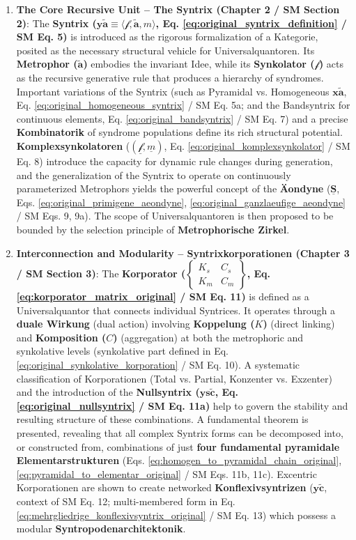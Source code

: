 \documentclass[12pt]{article}
\newcommand{\syntrix}{\bm{y\widetilde{a}}}
\newcommand{\homogeneoussyntrix}{\bm{x\widetilde{a}}}
\newcommand{\metrophor}{\bm{\widetilde{a}}}
\newcommand{\synkolator}{\mathcal{f}}
\newcommand{\synkolationsstufe}{m}
\newcommand{\korporatoroperator}{\begin{Bmatrix} K_s & C_s \\ K_m & C_m \end{Bmatrix}}
\newcommand{\nullsyntrix}{\bm{ys\widetilde{c}}}
\newcommand{\konflexivsyntrix}{\bm{y\widetilde{c}}}
\begin{document}
\begin{enumerate}
    \item \textbf{The Core Recursive Unit – The Syntrix (Chapter 2 / SM Section 2)}: The \textbf{Syntrix (\( \syntrix \equiv \langle \synkolator, \metrophor, \synkolationsstufe \rangle \), Eq. \eqref{eq:original_syntrix_definition} / SM Eq. 5)} is introduced as the rigorous formalization of a Kategorie, posited as the necessary structural vehicle for Universalquantoren. Its \textbf{Metrophor (\( \metrophor \))} embodies the invariant Idee, while its \textbf{Synkolator (\( \synkolator \))} acts as the recursive generative rule that produces a hierarchy of syndromes. Important variations of the Syntrix (such as Pyramidal vs. Homogeneous \( \homogeneoussyntrix \), Eq. \eqref{eq:original_homogeneous_syntrix} / SM Eq. 5a; and the Bandsyntrix for continuous elements, Eq. \eqref{eq:original_bandsyntrix} / SM Eq. 7) and a precise \textbf{Kombinatorik} of syndrome populations define its rich structural potential. \textbf{Komplexsynkolatoren} (\( (\underline{\synkolator}, \underline{\synkolationsstufe}) \), Eq. \eqref{eq:original_komplexsynkolator} / SM Eq. 8) introduce the capacity for dynamic rule changes during generation, and the generalization of the Syntrix to operate on continuously parameterized Metrophors yields the powerful concept of the \textbf{Äondyne} (\( \underline{\bm{S}} \), Eqs. \eqref{eq:original_primigene_aeondyne}, \eqref{eq:original_ganzlaeufige_aeondyne} / SM Eqs. 9, 9a). The scope of Universalquantoren is then proposed to be bounded by the selection principle of \textbf{Metrophorische Zirkel}.

    \item \textbf{Interconnection and Modularity – Syntrixkorporationen (Chapter 3 / SM Section 3)}: The \textbf{Korporator (\( \korporatoroperator \), Eq. \eqref{eq:korporator_matrix_original} / SM Eq. 11)} is defined as a Universalquantor that connects individual Syntrices. It operates through a \textbf{duale Wirkung} (dual action) involving \textbf{Koppelung (\( K \))} (direct linking) and \textbf{Komposition (\( C \))} (aggregation) at both the metrophoric and synkolative levels (synkolative part defined in Eq. \eqref{eq:original_synkolative_korporation} / SM Eq. 10). A systematic classification of Korporationen (Total vs. Partial, Konzenter vs. Exzenter) and the introduction of the \textbf{Nullsyntrix (\( \nullsyntrix \), Eq. \eqref{eq:original_nullsyntrix} / SM Eq. 11a)} help to govern the stability and resulting structure of these combinations. A fundamental theorem is presented, revealing that all complex Syntrix forms can be decomposed into, or constructed from, combinations of just \textbf{four fundamental pyramidale Elementarstrukturen} (Eqs. \eqref{eq:homogen_to_pyramidal_chain_original}, \eqref{eq:pyramidal_to_elementar_original} / SM Eqs. 11b, 11c). Excentric Korporationen are shown to create networked \textbf{Konflexivsyntrizen} (\( \konflexivsyntrix \), context of SM Eq. 12; multi-membered form in Eq. \eqref{eq:mehrgliedrige_konflexivsyntrix_original} / SM Eq. 13) which possess a modular \textbf{Syntropodenarchitektonik}.


\end{enumerate}
\end{document}
